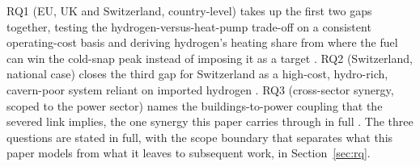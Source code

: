 RQ1 (EU, UK and Switzerland, country-level) takes up the first two gaps together,
testing the hydrogen-versus-heat-pump trade-off on a consistent operating-cost basis and
deriving hydrogen's heating share from where the fuel can win the cold-snap peak instead
of imposing it as a target \citep{Rosenow2022PipeDream,ICCT2023h2heating}. RQ2
(Switzerland, national case) closes the third gap for Switzerland as a high-cost,
hydro-rich, cavern-poor system reliant on imported hydrogen
\citep{Gabrielli2020,IEA2023switzerland}. RQ3 (cross-sector synergy, scoped to the power
sector) names the buildings-to-power coupling that the severed link implies, the one
synergy this paper carries through in full
\citep{Brown2018Synergies,Zeyen2021Mitigating}. The three questions are stated in full,
with the scope boundary that separates what this paper models from what it leaves to
subsequent work, in Section~\ref{sec:rq}.

